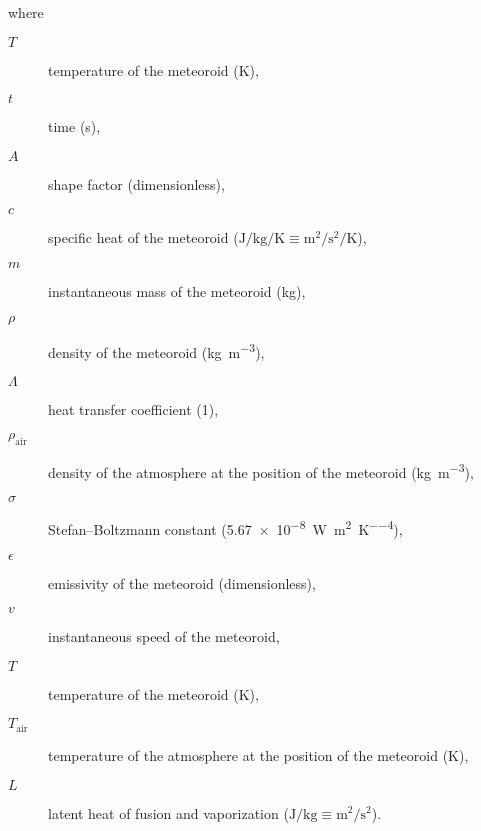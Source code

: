        where
        \begin{description}
            \item[$T$]
                temperature of the meteoroid ($\mathrm{K}$),
            \item[$t$]
                time (\si{\second}),
            \item[$A$]
                shape factor (dimensionless),
            \item[$c$]
                specific heat of the meteoroid ($\si{\joule\per\kilo\gram\per\kelvin} \equiv \si{\metre\squared\per\second\squared\per\kelvin}$),
            \item[$m$]
                instantaneous mass of the meteoroid (\si{\kilo\gram}),
            \item[$\rho$]
                density of the meteoroid (\si{\kilo\gram\per\metre\cubed}),
            \item[$\Lambda$]
                heat transfer coefficient (\si{1}),
            \item[$\rho_\mathrm{air}$]
                density of the atmosphere at the position of the meteoroid (\si{\kilo\gram\per\metre\cubed}),
            \item[$\sigma$]
                Stefan--Boltzmann constant (\SI{5.67e-8}{\watt\per\metre\squared\per\kelvin\tothe{4}}),
            \item[$\epsilon$]
                emissivity of the meteoroid (dimensionless),
            \item[$v$]
                instantaneous speed of the meteoroid,
            \item[$T$]
                temperature of the meteoroid (\si{\kelvin}),
            \item[$T_\mathrm{air}$]
                temperature of the atmosphere at the position of the meteoroid (\si{\kelvin}),
            \item[$L$]
                latent heat of fusion and vaporization ($\si{\joule\per\kilo\gram} \equiv \si{\metre\squared\per\second\squared}$).

        \end{description}

